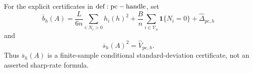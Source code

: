 For the explicit certificates in \({\rm def:pc-handle}\), set
\[
 \overline b_h(A)=\frac{L}{6n}\sum_{i:N_i>0}h_i(h)^2
 +\frac{B}{n}\sum_{i\in\mathcal V_n}\mathbf1\{N_i=0\}
 +\widehat\Delta_{\mathrm{pc},h}
\]
and
\[
 \overline s_h(A)^2=\widehat V_{\mathrm{pc},h}.
\]
Thus \(\overline s_h(A)\) is a finite-sample conditional standard-deviation certificate, not an asserted sharp-rate formula.